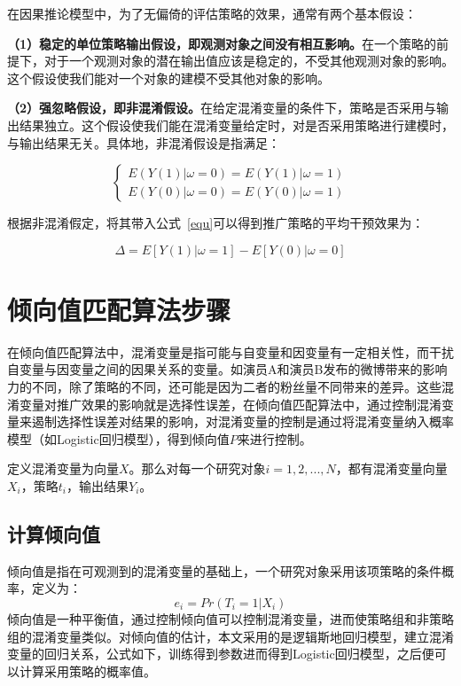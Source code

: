 在因果推论模型中，为了无偏倚的评估策略的效果，通常有两个基本假设：

\textbf{（1）稳定的单位策略输出假设，即观测对象之间没有相互影响。}在一个策略的前提下，对于一个观测对象的潜在输出值应该是稳定的，不受其他观测对象的影响。这个假设使我们能对一个对象的建模不受其他对象的影响。

\textbf{（2）强忽略假设，即非混淆假设。}在给定混淆变量的条件下，策略是否采用与输出结果独立。这个假设使我们能在混淆变量给定时，对是否采用策略进行建模时，与输出结果无关。具体地，非混淆假设是指满足：

\begin{equation}
\begin{cases}
E(Y(1)|\omega=0)=E(Y(1)|\omega=1)\\
E(Y(0)|\omega=0)=E(Y(0)|\omega=1)
\end{cases}
\end{equation}

根据非混淆假定，将其带入公式~\ref{equ}可以得到推广策略的平均干预效果为：

\begin{equation}
\Delta=E[Y(1)|\omega=1]-E[Y(0)|\omega=0]
\end{equation}

\section{倾向值匹配算法步骤}

在倾向值匹配算法中，混淆变量是指可能与自变量和因变量有一定相关性，而干扰自变量与因变量之间的因果关系的变量。如演员A和演员B发布的微博带来的影响力的不同，除了策略的不同，还可能是因为二者的粉丝量不同带来的差异。这些混淆变量对推广效果的影响就是选择性误差，在倾向值匹配算法中，通过控制混淆变量来遏制选择性误差对结果的影响，对混淆变量的控制是通过将混淆变量纳入概率模型（如Logistic回归模型），得到倾向值$P$来进行控制。

定义混淆变量为向量$X$。那么对每一个研究对象$i=1,2, ...,N$，都有混淆变量向量$X_i$，策略$t_i$，输出结果$Y_i$。

\subsection{计算倾向值}

倾向值是指在可观测到的混淆变量的基础上，一个研究对象采用该项策略的条件概率，定义为：
\begin{equation}
e_i = Pr(T_i = 1 | X_i)
\end{equation}
倾向值是一种平衡值，通过控制倾向值可以控制混淆变量，进而使策略组和非策略组的混淆变量类似。对倾向值的估计，本文采用的是逻辑斯地回归模型，建立混淆变量的回归关系，公式如下，训练得到参数进而得到Logistic回归模型，之后便可以计算采用策略的概率值。

